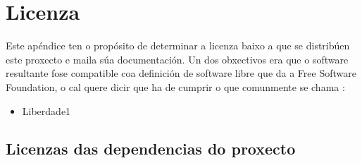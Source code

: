 \chapter[Apéndice]{
  \label{chp:dicionario}
  Licenza
}

Este apéndice ten o propósito de determinar a licenza baixo a que se distribúen este proxecto e maila súa documentación. Un dos obxectivos era que o software resultante fose compatible coa definición de software libre que da a Free Software Foundation, o cal quere dicir que ha de cumprir o que comunmente se chama \cite{licenza}:

\begin{itemize}
	\item Liberdade1
\end{itemize} 

\section{Licenzas das dependencias do proxecto}

